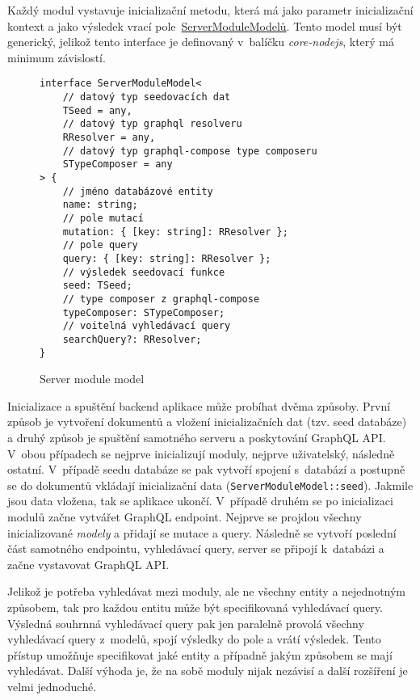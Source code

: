 Každý modul vystavuje inicializační metodu, která má jako parametr inicializační kontext a jako výsledek vrací pole~\hyperref[code:server_module_model]{ServerModuleModelů}. Tento model musí být generický, jelikož tento interface je definovaný v~balíčku \emph{core-nodejs}, který má minimum závislostí.

\begin{figure}[h!]
    \centering
    \begin{verbatim}
interface ServerModuleModel<
    // datový typ seedovacích dat    
    TSeed = any,
    // datový typ graphql resolveru
    RResolver = any,
    // datový typ graphql-compose type composeru
    STypeComposer = any
> {
    // jméno databázové entity    
    name: string;
    // pole mutací
    mutation: { [key: string]: RResolver };
    // pole query
    query: { [key: string]: RResolver };
    // výsledek seedovací funkce
    seed: TSeed;
    // type composer z graphql-compose 
    typeComposer: STypeComposer;
    // voitelná vyhledávací query
    searchQuery?: RResolver;
}
    \end{verbatim}
    \caption{Server module model}
    \label{code:server_module_model}
\end{figure}

Inicializace a spuštění backend aplikace může probíhat dvěma způsoby. První způsob je vytvoření dokumentů a vložení inicializačních dat (tzv. seed databáze) a druhý způsob je spuštění samotného serveru a poskytování GraphQL API. V~obou případech se nejprve inicializují moduly, nejprve uživatelský, následně ostatní. V~případě seedu databáze se pak vytvoří spojení s~databází a postupně se do dokumentů vkládají inicializační data (\texttt{ServerModuleModel::seed}). Jakmile jsou data vložena, tak se aplikace ukončí. V~případě druhém se po inicializaci modulů začne vytvářet GraphQL endpoint. Nejprve se projdou všechny inicializované \emph{modely} a přidají se mutace a query. Následně se vytvoří poslední část samotného endpointu, vyhledávací query, server se připojí k~databázi a začne vystavovat GraphQL API.

Jelikož je potřeba vyhledávat mezi moduly, ale ne všechny entity a nejednotným způsobem, tak pro každou entitu může být specifikovaná vyhledávací query. Výsledná souhrnná vyhledávací query pak jen paralelně provolá všechny vyhledávací query z~modelů, spojí výsledky do pole a vrátí výsledek. Tento přístup umožňuje specifikovat jaké entity a případně jakým způsobem se mají vyhledávat. Další výhoda je, že na sobě moduly nijak nezávisí a další rozšíření je velmi jednoduché.
